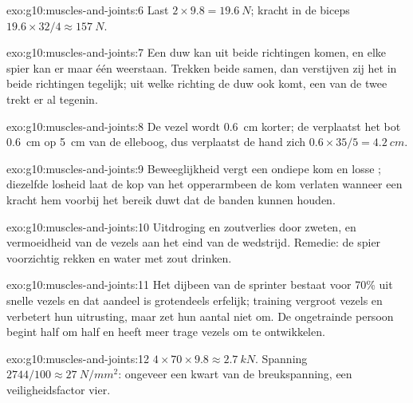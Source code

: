 \begin{solution}{exo:g10:muscles-and-joints:6}
Last $2 \times 9.8 = \qty{19.6}{N}$; kracht in de biceps $19.6 \times 32/4
\approx \qty{157}{N}$.
\end{solution}

\begin{solution}{exo:g10:muscles-and-joints:7}
Een duw kan uit beide richtingen komen, en elke spier kan er maar één
weerstaan. Trekken beide samen, dan verstijven zij het  in beide
richtingen tegelijk; uit welke richting de duw ook komt, een van de twee
trekt er al tegenin.
\end{solution}

\begin{solution}{exo:g10:muscles-and-joints:8}
De vezel wordt \qty{0.6}{cm} korter; de  verplaatst het bot
\qty{0.6}{cm} op \qty{5}{cm} van de elleboog, dus verplaatst de hand zich
$0.6 \times 35/5 = \qty{4.2}{cm}$.
\end{solution}

\begin{solution}{exo:g10:muscles-and-joints:9}
Beweeglijkheid vergt een ondiepe kom en losse ; diezelfde
losheid laat de kop van het opperarmbeen de kom verlaten wanneer een
kracht hem voorbij het bereik duwt dat de banden kunnen houden.
\end{solution}

\begin{solution}{exo:g10:muscles-and-joints:10}
Uitdroging en zoutverlies door zweten, en vermoeidheid van de vezels aan
het eind van de wedstrijd. Remedie: de spier voorzichtig rekken en water
met zout drinken.
\end{solution}

\begin{solution}{exo:g10:muscles-and-joints:11}
Het dijbeen van de sprinter bestaat voor 70\% uit snelle vezels en dat
aandeel is grotendeels erfelijk; training vergroot vezels en verbetert
hun uitrusting, maar zet hun aantal niet om. De ongetrainde persoon
begint half om half en heeft meer trage vezels om te ontwikkelen.
\end{solution}

\begin{solution}{exo:g10:muscles-and-joints:12}
$4 \times 70 \times 9.8 \approx \qty{2.7}{kN}$. Spanning $2744/100
\approx \qty{27}{N/mm^2}$: ongeveer een kwart van de breukspanning, een
veiligheidsfactor vier.
\end{solution}


